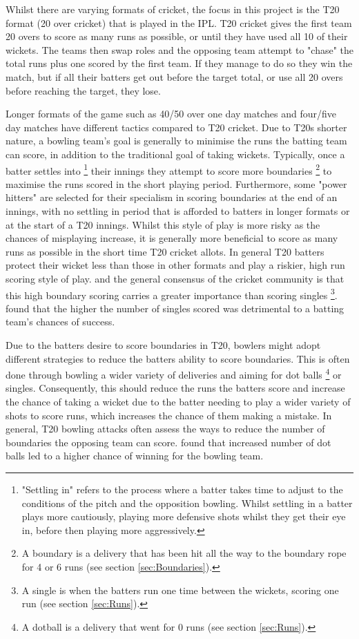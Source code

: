 \documentclass[12pt,a4paper]{report}
\theoremstyle{definition}
\begin{document}
Whilst there are varying formats of cricket, the focus in this project is the T20 format (20 over cricket) that is played in the IPL.
T20 cricket gives the first team 20 overs to score as many runs as possible, or until they have used all 10 of their wickets.
The teams then swap roles and the opposing team attempt to "chase" the total runs plus one scored by the first team. 
If they manage to do so they win the match, but if all their batters get out before the target total, or use all 20 overs before reaching the target, they lose.

Longer formats of the game such as 40/50 over one day matches and four/five day matches have different tactics compared to T20 cricket.
Due to T20s shorter nature, a bowling team's goal is generally to minimise the runs the batting team can score, in addition to the traditional goal of taking wickets.
Typically, once a batter settles into \footnote{"Settling in" refers to the process where a batter takes time to adjust to the conditions of the pitch and the opposition bowling. Whilst settling in a batter plays more cautiously, playing more defensive shots whilst they get their eye in, before then playing more aggressively.} their innings they attempt to score more boundaries \footnote{A boundary is a delivery that has been hit all the way to the boundary rope for 4 or 6 runs (see section \ref{sec:Boundaries}).} to maximise the runs scored in the short playing period.
Furthermore, some "power hitters" are selected for their specialism in scoring boundaries at the end of an innings, with no settling in period that is afforded to batters in longer formats or at the start of a T20 innings.
Whilst this style of play is more risky as the chances of misplaying increase, it is generally more beneficial to score as many runs as possible in the short time T20 cricket allots.
In general T20 batters protect their wicket less than those in other formats and play a riskier, high run scoring style of play.
\citet{Irvine2017} and the general consensus of the cricket community is that this high boundary scoring carries a greater importance than scoring singles \footnote{A single is when the batters run one time between the wickets, scoring one run (see section \ref{sec:Runs}).}. 
\citet{Irvine2017} found that the higher the number of singles scored was detrimental to a batting team's chances of success.

Due to the batters desire to score boundaries in T20, bowlers might adopt different strategies to reduce the batters ability to score boundaries. 
This is often done through bowling a wider variety of deliveries and aiming for dot balls \footnote{A dotball is a delivery that went for 0 runs (see section \ref{sec:Runs}).} or singles.
Consequently, this should reduce the runs the batters score and increase the chance of taking a wicket due to the batter needing to play a wider variety of shots to score runs, which increases the chance of them making a mistake.
In general, T20 bowling attacks often assess the ways to reduce the number of boundaries the opposing team can score.
\citet{Irvine2017} found that increased number of dot balls led to a higher chance of winning for the bowling team. 
\end{document}
